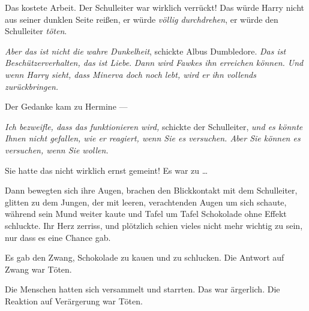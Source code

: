 Das kostete Arbeit. Der Schulleiter war wirklich verrückt! Das würde Harry nicht aus seiner dunklen Seite reißen, er würde \emph{völlig durchdrehen}, er würde den Schulleiter \emph{töten}.

\emph{Aber das ist nicht die wahre Dunkelheit}, schickte Albus Dumbledore. \emph{Das ist Beschützerverhalten, das ist Liebe}. \emph{Dann wird Fawkes ihn erreichen können. Und wenn Harry sieht, dass Minerva doch noch lebt, wird er ihn vollends zurückbringen.}

Der Gedanke kam zu Hermine —

\emph{Ich bezweifle, dass das funktionieren wird,} schickte der Schulleiter, \emph{und es könnte Ihnen nicht gefallen, wie er reagiert, wenn Sie es versuchen. Aber Sie können es versuchen, wenn Sie wollen.}

Sie hatte das nicht wirklich ernst gemeint! Es war zu …

Dann bewegten sich ihre Augen, brachen den Blickkontakt mit dem Schulleiter, glitten zu dem Jungen, der mit leeren, verachtenden Augen um sich schaute, während sein Mund weiter kaute und Tafel um Tafel Schokolade ohne Effekt schluckte. Ihr Herz zerriss, und plötzlich schien vieles nicht mehr wichtig zu sein, nur dass es eine Chance gab.

\later

Es gab den Zwang, Schokolade zu kauen und zu schlucken. Die Antwort auf Zwang war Töten.

Die Menschen hatten sich versammelt und starrten. Das war ärgerlich. Die Reaktion auf Verärgerung war Töten.

